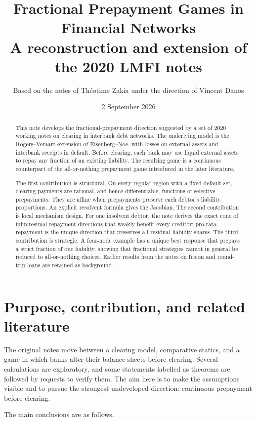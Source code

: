 \documentclass[11pt]{article}
\title{Fractional Prepayment Games in Financial Networks\\
\large A reconstruction and extension of the 2020 LMFI notes}
\author{Based on the notes of Th\'eotime Zakia under the direction of Vincent Danos}
\date{2 September 2026}
\theoremstyle{definition}
\theoremstyle{remark}
\begin{document}
\maketitle

\begin{abstract}
This note develops the fractional-prepayment direction suggested by a set of
2020 working notes on clearing in interbank debt networks.  The underlying
model is the Rogers--Veraart extension of Eisenberg--Noe, with losses on
external assets and interbank receipts in default.  Before clearing, each bank
may use liquid external assets to repay any fraction of an existing liability.
The resulting game is a continuous counterpart of the all-or-nothing
prepayment game introduced in the later literature.

The first contribution is structural.  On every regular region with a fixed
default set, clearing payments are rational, and hence differentiable,
functions of selective prepayments.  They are affine when prepayments preserve
each debtor's liability proportions.  An explicit resolvent formula gives the
Jacobian.  The second contribution is local mechanism design.  For one
insolvent debtor, the note derives the exact cone of infinitesimal repayment
directions that weakly benefit every creditor; pro-rata repayment is the unique
direction that preserves all residual liability shares.  The third
contribution is strategic.  A four-node example has a unique best response that
prepays a strict fraction of one liability, showing that fractional strategies
cannot in general be reduced to all-or-nothing choices.  Earlier results from
the notes on fusion and round-trip loans are retained as background.
\end{abstract}

\tableofcontents

\section{Purpose, contribution, and related literature}

The original notes move between a clearing model, comparative statics, and a
game in which banks alter their balance sheets before clearing.  Several
calculations are exploratory, and some statements labelled as theorems are
followed by requests to verify them.  The aim here is to make the assumptions
visible and to pursue the strongest undeveloped direction: continuous
prepayment before clearing.

The main conclusions are as follows.
\end{document}
